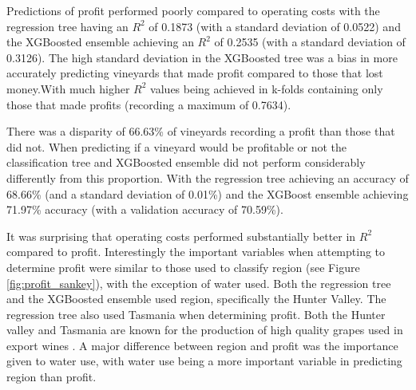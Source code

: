 \documentclass[review,12pt,authoryear]{elsarticle}
\begin{document}
\begin{linenumbers}
Predictions of profit performed poorly compared to operating costs with the regression tree having an $R^2$ of 0.1873 (with a standard deviation of 0.0522) and the XGBoosted ensemble achieving an $R^2$ of 0.2535 (with a standard deviation of 0.3126). The high standard deviation in the XGBoosted tree was a bias in more accurately predicting vineyards that made profit compared to those that lost money.With much higher $R^2$ values being achieved in k-folds containing only those that made profits (recording a maximum of 0.7634).
\par
There was a disparity of 66.63\% of vineyards recording a profit than those that did not. When predicting if a vineyard would be profitable or not the classification tree and XGBoosted ensemble did not perform considerably differently from this proportion. With the regression tree achieving an accuracy of 68.66\% (and a standard deviation of 0.01\%) and the XGBoost ensemble achieving 71.97\% accuracy (with a validation accuracy of 70.59\%).
\par
It was surprising that operating costs performed substantially better in $R^2$ compared to profit. Interestingly the important variables when attempting to determine profit were similar to those used to classify region (see Figure \ref{fig:profit_sankey}), with the exception of water used. Both the regression tree and the XGBoosted ensemble used region, specifically the Hunter Valley. The regression tree also used Tasmania when determining profit. Both the Hunter valley and Tasmania are known for the production of high quality grapes used in export wines \citep{wineaustraliaNationalVintageReport2022}. A major difference between region and profit was the importance given to water use, with water use being a more important variable in predicting region than profit. 


\end{linenumbers}
\end{document}
